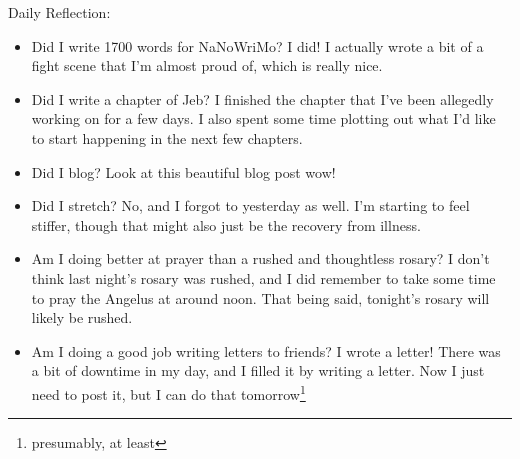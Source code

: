 \documentclass[12pt]{article}[titlepage]
\renewcommand{\,}{\textsuperscript{,}}
\begin{document}
Daily Reflection:
\begin{itemize}
\item Did I write 1700 words for NaNoWriMo?
I did! I actually wrote a bit of a fight scene that I'm almost proud of, which is really nice.
\item Did I write a chapter of Jeb?
I finished the chapter that I've been allegedly working on for a few days.
I also spent some time plotting out what I'd like to start happening in the next few chapters.
\item Did I blog? Look at this beautiful blog post wow!
\item Did I stretch? No, and I forgot to yesterday as well.
I'm starting to feel stiffer, though that might also just be the recovery from illness.
\item Am I doing better at prayer than a rushed and thoughtless rosary? 
I don't think last night's rosary was rushed, and I did remember to take some time to pray the Angelus at around noon.
That being said, tonight's rosary will likely be rushed.
\item Am I doing a good job writing letters to friends?
I wrote a letter!
There was a bit of downtime in my day, and I filled it by writing a letter.
Now I just need to post it, but I can do that tomorrow\footnote{presumably, at least}
\end{itemize}
\end{document}
